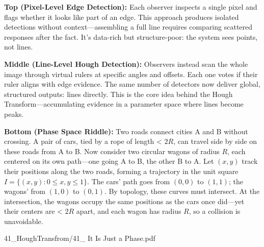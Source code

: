 \begin{SideNotePage}{
  \textbf{Top (Pixel-Level Edge Detection):}  
  Each observer inspects a single pixel and flags whether it looks like part of an edge. This approach produces isolated detections without context—assembling a full line requires comparing scattered responses after the fact. It's data-rich but structure-poor: the system sees points, not lines. \par

  \textbf{Middle (Line-Level Hough Detection):}  
  Observers instead scan the whole image through virtual rulers at specific angles and offsets. Each one votes if their ruler aligns with edge evidence. The same number of detectors now deliver global, structured outputs: lines directly. This is the core idea behind the Hough Transform—accumulating evidence in a parameter space where lines become peaks. \par

  \textbf{Bottom (Phase Space Riddle):}  
  Two roads connect cities A and B without crossing. A pair of cars, tied by a rope of length < $2R$, can travel side by side on these roads from A to B. Now consider two circular wagons of radius $R$, each centered on its own path—one going A to B, the other B to A. Let $(x, y)$ track their positions along the two roads, forming a trajectory in the unit square $I = \{(x, y) : 0 \leq x, y \leq 1\}$. The cars’ path goes from $(0, 0)$ to $(1, 1)$; the wagons' from $(1, 0)$ to $(0, 1)$. By topology, these curves must intersect. At the intersection, the wagons occupy the same positions as the cars once did—yet their centers are < $2R$ apart, and each wagon has radius $R$, so a collision is unavoidable. \par    
}{41_HoughTransfrom/41_ It Is Just a Phase.pdf}
\end{SideNotePage}
